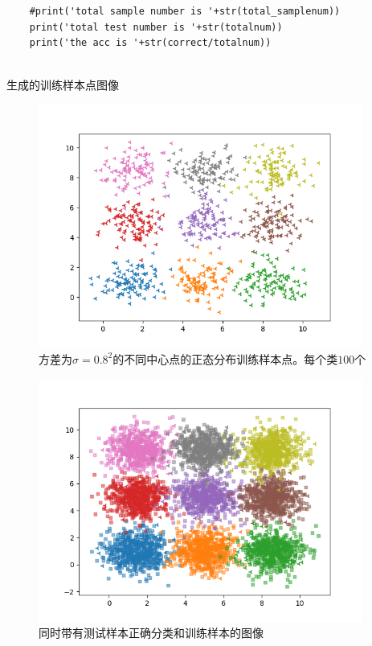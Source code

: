 \documentclass{article}
\begin{document}
\begin{verbatim}
    #print('total sample number is '+str(total_samplenum))
    print('total test number is '+str(totalnum))
    print('the acc is '+str(correct/totalnum))
    
\end{verbatim}
生成的训练样本点图像

\begin{figure}[H]
   \centering
   \begin{minipage}[t]{1.0\linewidth}
       \centering
       \includegraphics[height=8cm]{normal.png}
       \caption{方差为$\sigma=0.8^2$的不同中心点的正态分布训练样本点。每个类$100$个}
   \end{minipage}
\end{figure}
\begin{figure}[H]
    \centering
    \begin{minipage}[t]{1.0\linewidth}
        \centering
        \includegraphics[height=8cm]{normal_with_test.png}
        \caption{同时带有测试样本正确分类和训练样本的图像}
    \end{minipage}
 \end{figure}
\end{document}
